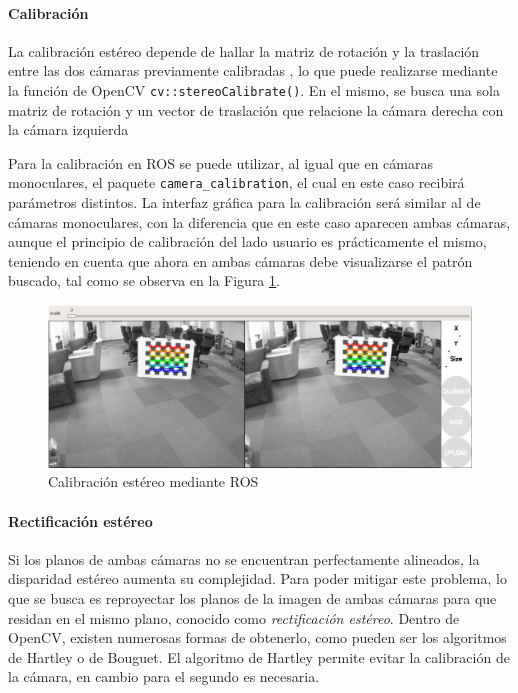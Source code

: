 \paragraph{Calibración}
La calibración estéreo depende de hallar la matriz de rotación y la traslación entre las dos cámaras previamente calibradas \cite{kaehler2017}, lo que puede realizarse mediante la función de OpenCV \texttt{cv::stereoCalibrate()}. En el mismo, se busca una sola matriz de rotación y un vector de traslación que relacione la cámara derecha con la cámara izquierda

Para la calibración en ROS se puede utilizar, al igual que en cámaras monoculares, el paquete \texttt{camera\_calibration}, el cual en este caso recibirá parámetros distintos. La interfaz gráfica para la calibración será similar al de cámaras monoculares, con la diferencia que en este caso aparecen ambas cámaras, aunque el principio de calibración del lado usuario es prácticamente el mismo, teniendo en cuenta que ahora en ambas cámaras debe visualizarse el patrón buscado, tal como se observa en la Figura \ref{fig:stereocalibrationchessboardrosexample}.
\begin{figure}
    \centering
    \includegraphics[width=\linewidth]{Img/StereoCalibrationChessboard.png}
    \caption{Calibración estéreo mediante ROS}
    \label{fig:stereocalibrationchessboardrosexample}
\end{figure}


\paragraph{Rectificación estéreo}
Si los planos de ambas cámaras no se encuentran perfectamente alineados, la disparidad estéreo aumenta su complejidad. Para poder mitigar este problema, lo que se busca es reproyectar los planos de la imagen de ambas cámaras para que residan en el mismo plano, conocido como \textit{rectificación estéreo}. Dentro de OpenCV, existen numerosas formas de obtenerlo, como pueden ser los algoritmos de Hartley o de Bouguet. El algoritmo de Hartley permite evitar la calibración de la cámara, en cambio para el segundo es necesaria.

